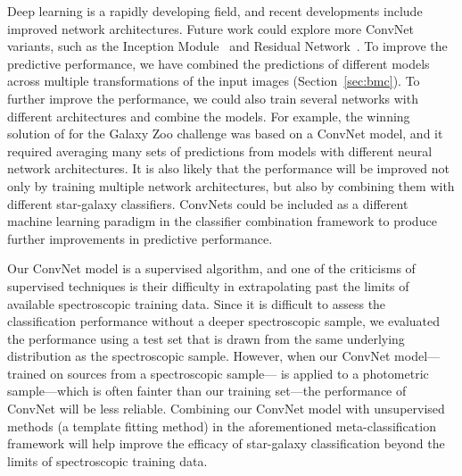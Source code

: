 Deep learning is a rapidly developing field, and recent developments include
improved network architectures.
Future work could explore more ConvNet variants, such as the
Inception Module~\citep{szegedy2015going} and Residual Network~\citep{he2015deep}.
To improve the predictive performance,
we have combined the predictions of different models across multiple
transformations of the input images (Section~\ref{sec:bmc}).
To further improve the performance, we could also train several networks
with different architectures and combine the models.
For example, the winning solution of \cite{dieleman2015rotation}
for the Galaxy Zoo challenge was based on a ConvNet model,
and it required averaging many sets of predictions from models with different
neural network architectures.
It is also likely that the performance will be improved
not only by training multiple network architectures,
but also by combining them with different star-galaxy classifiers.
ConvNets could be included as a different machine learning paradigm in the
classifier combination framework to produce further improvements in
predictive performance.

Our ConvNet model is a supervised algorithm, and one of the criticisms
of supervised techniques is their difficulty in extrapolating past the limits
of available spectroscopic training data.
Since it is difficult to assess the classification performance without a deeper
spectroscopic sample, we evaluated the performance using a test set
that is drawn from the same underlying distribution as the spectroscopic sample.
However, when our ConvNet model---trained on sources from a spectroscopic sample--- is
applied to a photometric sample---which is often fainter than our training set---the
performance of ConvNet will be less reliable.
Combining our ConvNet model with unsupervised methods (\eg a template fitting
method) in the aforementioned meta-classification framework will
help improve the efficacy of star-galaxy classification
beyond the limits of spectroscopic training data.


